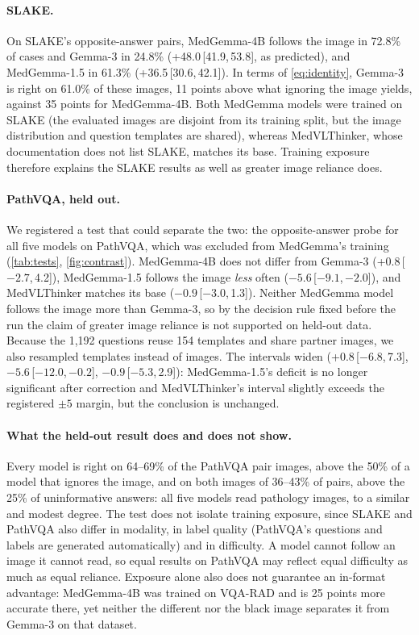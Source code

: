 \documentclass[10pt,twocolumn,letterpaper]{article}
\newcommand{\ci}[2]{\,[#1,\,#2]}  %
\begin{document}
\paragraph{SLAKE.} On SLAKE's opposite-answer pairs, MedGemma-4B follows the image in 72.8\% of cases and Gemma-3
in 24.8\% (+48.0\ci{41.9}{53.8}, as predicted), and MedGemma-1.5 in 61.3\% (+36.5\ci{30.6}{42.1}). In terms of
\cref{eq:identity}, Gemma-3 is right on 61.0\% of these images, 11 points above what ignoring the image yields,
against 35 points for MedGemma-4B. Both MedGemma models were trained on SLAKE (the evaluated images are disjoint
from its training split, but the image distribution and question templates are shared), whereas MedVLThinker,
whose documentation does not list SLAKE, matches its base. Training exposure therefore explains the SLAKE results as well as greater image
reliance does.

\paragraph{PathVQA, held out.} We registered a test that could separate the two: the opposite-answer probe for
all five models on PathVQA, which was excluded from MedGemma's training (\cref{tab:tests}, \cref{fig:contrast}).
MedGemma-4B does not differ from Gemma-3 (+0.8\ci{$-2.7$}{4.2}), MedGemma-1.5 follows the image \emph{less} often
($-5.6$\ci{$-9.1$}{$-2.0$}), and MedVLThinker matches its base ($-0.9$\ci{$-3.0$}{1.3}). Neither MedGemma model
follows the image more than Gemma-3, so by the decision rule fixed before the run the claim of greater image
reliance is not supported on held-out data. Because the 1,192 questions reuse 154 templates and share partner
images, we also resampled templates instead of images. The intervals widen (+0.8\ci{$-6.8$}{7.3},
$-5.6$\ci{$-12.0$}{$-0.2$}, $-0.9$\ci{$-5.3$}{2.9}): MedGemma-1.5's deficit is no longer significant after
correction and MedVLThinker's interval slightly exceeds the registered $\pm5$ margin, but the conclusion is
unchanged.

\paragraph{What the held-out result does and does not show.} Every model is right on 64--69\% of the PathVQA pair
images, above the 50\% of a model that ignores the image, and on both images of 36--43\% of pairs, above the 25\%
of uninformative answers: all five models read pathology images, to a similar and modest degree. The test does
not isolate training exposure, since SLAKE and PathVQA also differ in modality, in label quality (PathVQA's
questions and labels are generated automatically) and in difficulty. A model cannot follow an image it cannot
read, so equal results on PathVQA may reflect equal difficulty as much as equal reliance. Exposure alone also does not
guarantee an in-format advantage: MedGemma-4B was trained on VQA-RAD and is 25 points more accurate there, yet
neither the different nor the black image separates it from Gemma-3 on that dataset.
\end{document}
